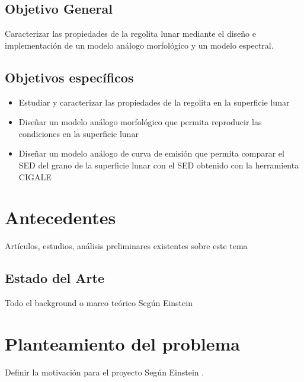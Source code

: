 \documentclass[12pt]{article}
\begin{document}
\subsection{Objetivo General}
Caracterizar las propiedades de la regolita lunar mediante el diseño e  implementación de un modelo análogo morfológico y un modelo espectral.

\subsection{Objetivos específicos}
\begin{itemize}
    \item Estudiar y caracterizar las propiedades de la regolita  en la superficie lunar
    \item Diseñar un modelo análogo morfológico que permita reproducir las condiciones en la superficie lunar %
    \item Diseñar un modelo análogo de curva de emisión que permita comparar el SED del grano de la superficie lunar con el SED obtenido con la herramienta CIGALE
\end{itemize}

\section{Antecedentes}
Artículos, estudios, análisis preliminares existentes sobre este tema
\subsection{Estado del Arte}
Todo el background o marco teórico Según Einstein
\section{Planteamiento del problema}
Definir la motivación para el proyecto Según Einstein \cite{watson53}.

\printbibliography
\end{document}
